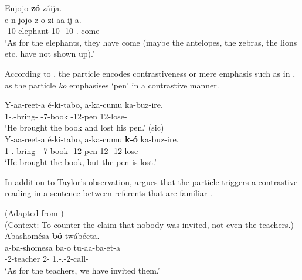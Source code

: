 \documentclass[output=paper]{langscibook}
\begin{document}
\ex
Enjojo  \textbf{zó}  záija.\\
\gll
e-n-jojo  z-o  zi-aa-ij-a.\\
\AUG{}-10-elephant  10-\CM{}  10\SM{}-\N{}.\PST{}-come-\FV{}\\
\glt
‘As for the elephants, they have come (maybe the antelopes, the zebras, the lions etc. have not shown up).’\\


\z
\z

According to \citet{Taylor1985}, the particle encodes contrastiveness or mere emphasis such as in , as the particle \textit{ko} emphasises ‘pen’ in a contrastive manner.\largerpage[2.25]

\ea
\label{bkm:Ref113545408} \citep[74, glosses adapted]{Taylor1985}
\ea
\label{bkm:Ref113545408:a}
\gll
Y-aa-reet-a  é-ki-tabo,  a-ka-cumu  ka-buz-ire.\\
1\SM{}-\N{}.\PST{}-bring-\FV{}  \AUG{}-7-book  \AUG{}-12-pen  12\SM{}-lose-\PFV{}\\
\glt
‘He brought the book and lost his pen.’ (sic)\\

\ex
\label{bkm:Ref113545408:b}
\gll
Y-aa-reet-a  é-ki-tabo,  a-ka-cumu  \textbf{k-ó}  ka-buz-ire.\\
1\SM{}-\N{}.\PST{}-bring-\FV{}  \AUG{}-7-book  \AUG{}-12-pen  12-\CM{}  12\SM{}-lose-\PFV{}\\
\glt
‘He brought the book, but the pen is lost.’\\


\z
\z


In addition to Taylor’s observation, \citet{Asiimwe2014} argues that the particle triggers a contrastive reading in a sentence between referents that are familiar .

\ea
\label{bkm:Ref111495139}
(Adapted from \citealt[236]{Asiimwe2014})\\
(Context: To counter the claim that nobody was invited, not even the teachers.)\\
Abashomésa \textbf{bó} twábéeta.\\
\gll
a-ba-shomesa  ba-o  tu-aa-ba-et-a\\
\AUG{}-2-teacher  2-\CM{}  1\PL{}.\SM{}-\N{}.\PST{}-2\OM{}-call-\FV{}\\
\glt
`As for the teachers, we have invited them.’\\
\end{document}

